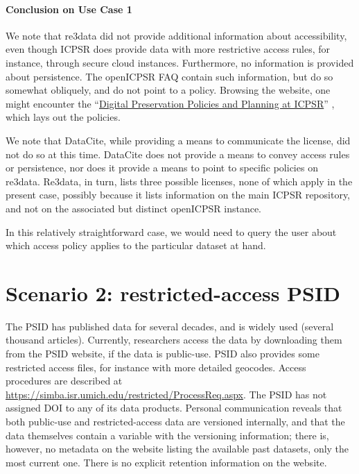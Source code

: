 \documentclass[10pt,letterpaper]{article}
\begin{document}
\paragraph{Conclusion on Use Case 1}
We note that re3data did not provide additional information about  accessibility, even though ICPSR does provide data with more restrictive access rules, for instance, through secure cloud instances. Furthermore, no information is provided  about persistence. The openICPSR FAQ contain such information, but do so somewhat obliquely, and do not point to a policy. Browsing the website, one might encounter the ``\href{https://www.icpsr.umich.edu/icpsrweb/content/datamanagement/preservation/policies/index.html}{Digital Preservation Policies and Planning at ICPSR}'' \parencite{icpsr-preservation}, which  lays out the policies. 

We note that DataCite, while providing a means to communicate the license, did not do so at this time. DataCite does not provide a means to convey access rules or persistence, nor does it provide a means to point to specific policies on re3data. Re3data, in turn, lists three possible licenses, none of which apply in the present case, possibly because it lists information on the main ICPSR repository, and not on the associated but distinct openICPSR instance.

In this relatively straightforward case, we would need to query the user  about  which access policy applies to the particular dataset at hand. 

\section{Scenario 2: restricted-access PSID}
The \ac{PSID} has published data for several decades, and is widely used (several thousand articles). Currently, researchers access the data by downloading them from the \ac{PSID} website, if the data is public-use. \ac{PSID} also provides some restricted access files, for instance with more detailed geocodes. Access procedures are described at \url{https://simba.isr.umich.edu/restricted/ProcessReq.aspx}. The \ac{PSID} has not assigned \ac{DOI} to any of its data products. Personal communication reveals that both public-use and restricted-access data are versioned internally, and that the data themselves contain a variable with the versioning information; there is, however, no metadata on the website listing the available past datasets, only the most current one. There is no explicit retention information on the website.
\end{document}
